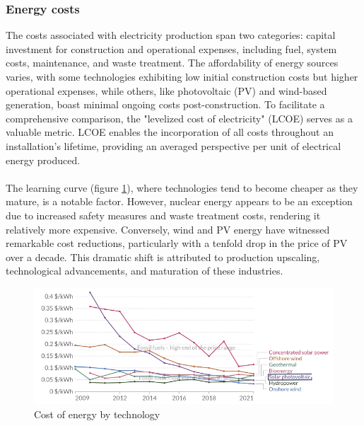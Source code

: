 \documentclass[../summary.tex]{subfiles}
\begin{document}
\subsubsection{Energy costs}

The costs associated with electricity production span two categories: capital investment for construction and operational expenses, including fuel, system costs, maintenance, and waste treatment. The affordability of energy sources varies, with some technologies exhibiting low initial construction costs but higher operational expenses, while others, like photovoltaic (PV) and wind-based generation, boast minimal ongoing costs post-construction. To facilitate a comprehensive comparison, the "levelized cost of electricity" (LCOE) serves as a valuable metric. LCOE enables the incorporation of all costs throughout an installation's lifetime, providing an averaged perspective per unit of electrical energy produced.\\
\\
The learning curve (figure \ref{fig:costofenergybytech}), where technologies tend to become cheaper as they mature, is a notable factor. However, nuclear energy appears to be an exception due to increased safety measures and waste treatment costs, rendering it relatively more expensive. Conversely, wind and PV energy have witnessed remarkable cost reductions, particularly with a tenfold drop in the price of PV over a decade. This dramatic shift is attributed to production upscaling, technological advancements, and maturation of these industries.

\begin{figure}[H]
	\centering
	\includegraphics[width=0.8\linewidth]{../images/cost_of_energy_by_tech}
	\caption{Cost of energy by technology}
	\label{fig:costofenergybytech}
\end{figure}
\end{document}
